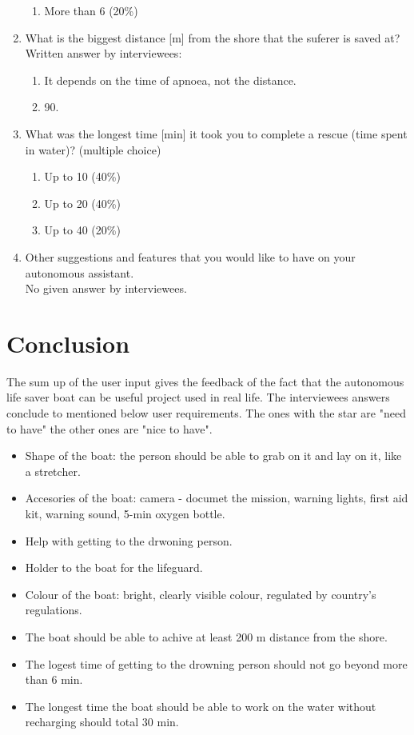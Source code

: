 \documentclass{article}[10pt]
\begin{document}
\begin{enumerate}
\begin{enumerate}
        \item   More than 6 (20\%)
    \end{enumerate}
    \item What is the biggest distance [m] from the shore that the suferer is saved at?\\
            Written answer by interviewees:
            \begin{enumerate}
                \item It depends on the time of apnoea, not the distance.
                \item 90.
            \end{enumerate} 
    \item What was the longest time [min] it took you to complete a rescue (time spent in water)? (multiple choice)
    \begin{enumerate}
        \item  Up to 10 (40\%)
        \item  Up to 20 (40\%)
        \item  Up to 40 (20\%)
    \end{enumerate}
    \item Other suggestions and features that you would like to have on your autonomous assistant.\\
           No given answer by interviewees.     
\end{enumerate}

\section*{Conclusion}
The sum up of the user input gives the feedback of the fact that the autonomous life saver boat can be useful project used in real life. The interviewees answers conclude to mentioned below user requirements. The ones with the star are "need to have" the other ones are "nice to have".
\begin{itemize}
     \item Shape of the boat: the person should be able to grab on it and lay on it, like a stretcher.
     \item Accesories of the boat: camera - documet the mission, warning lights, first aid kit, warning sound, 5-min oxygen bottle.
     \item Help with getting to the drwoning person.
     \item Holder to the boat for the lifeguard.
     \item Colour of the boat: bright, clearly visible colour, regulated by country's regulations.
     \item The boat should be able to achive at least 200 m distance from the shore.
     \item The logest time of getting to the drowning person should not go beyond more than 6 min.
     \item The longest time the boat should be able to work on the water without recharging should total 30 min.
\end{itemize}
\end{document}

